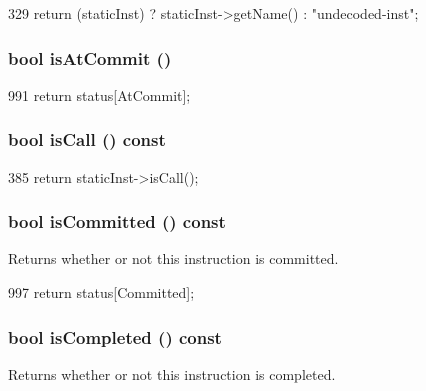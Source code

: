 \begin{DoxyCode}
329     { return (staticInst) ? staticInst->getName() : "undecoded-inst"; }
\end{DoxyCode}
\hypertarget{classInOrderDynInst_a8b514343a000efa2bf568c4f964cb8b1}{
\subsubsection[{isAtCommit}]{\setlength{\rightskip}{0pt plus 5cm}bool isAtCommit ()}}
\label{classInOrderDynInst_a8b514343a000efa2bf568c4f964cb8b1}



\begin{DoxyCode}
991 { return status[AtCommit]; }
\end{DoxyCode}
\hypertarget{classInOrderDynInst_aa2317a020504e552097abb001847f74c}{
\subsubsection[{isCall}]{\setlength{\rightskip}{0pt plus 5cm}bool isCall () const}}
\label{classInOrderDynInst_aa2317a020504e552097abb001847f74c}



\begin{DoxyCode}
385 { return staticInst->isCall(); }
\end{DoxyCode}
\hypertarget{classInOrderDynInst_a9cc760f9838c39bfb3112cdbfb468cf3}{
\subsubsection[{isCommitted}]{\setlength{\rightskip}{0pt plus 5cm}bool isCommitted () const}}
\label{classInOrderDynInst_a9cc760f9838c39bfb3112cdbfb468cf3}
Returns whether or not this instruction is committed. 


\begin{DoxyCode}
997 { return status[Committed]; }
\end{DoxyCode}
\hypertarget{classInOrderDynInst_a9065f06f69273b51a799acff12d2c4c7}{
\subsubsection[{isCompleted}]{\setlength{\rightskip}{0pt plus 5cm}bool isCompleted () const}}
\label{classInOrderDynInst_a9065f06f69273b51a799acff12d2c4c7}
Returns whether or not this instruction is completed. 


